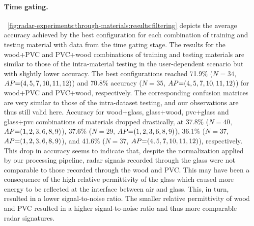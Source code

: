 \paragraph{Time gating.}
\fig~\ref{fig:radar-experiments:through-materials:results:filtering} depicts the average accuracy achieved by the best configuration for each combination of training and testing material with data from the time gating stage.
The results for the wood+PVC and PVC+wood combinations of training and testing materials are similar to those of the intra-material testing in the user-dependent scenario but with slightly lower accuracy. 
%
The best configurations reached 71.9\% ($N{=}34$, $\splitatcommas{AP{=}(4, 5, 7, 10, 11, 12)}$) and 70.8\% accuracy ($N{=}35$, $\splitatcommas{AP{=}(4, 5, 7, 10, 11, 12)}$) for wood+PVC and PVC+wood, respectively.
%
The corresponding confusion matrices are very similar to those of the intra-dataset testing, and our observations are thus still valid here. 
Accuracy for wood+glass, glass+wood, pvc+glass and glass+pvc combinations of materials dropped drastically, at 37.8\% ($N{=}40$, $\splitatcommas{AP{=}(1, 2, 3, 6, 8, 9)}$), 37.6\% ($N{=}29$, $\splitatcommas{AP{=}(1, 2, 3, 6, 8, 9)}$), 36.1\% ($N{=}37$, $\splitatcommas{AP{=}(1, 2, 3, 6, 8, 9)}$), and 41.6\% ($N{=}37$, $\splitatcommas{AP{=}(4, 5, 7, 10, 11, 12)}$), respectively.
%
This drop in accuracy seems to indicate that, despite the normalization applied by our processing pipeline, radar signals recorded through the glass were not comparable to those recorded through the wood and PVC. This may have been a consequence of the high relative permittivity of the glass which caused more energy to be reflected at the interface between air and glass. This, in turn, resulted in a lower signal-to-noise ratio. 
%
The smaller relative permittivity of wood and PVC resulted in a higher signal-to-noise ratio and thus more comparable radar signatures.


